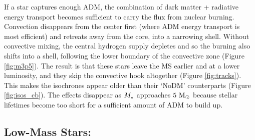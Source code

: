 \documentclass[useAMS,usenatbib]{mnras}
\begin{document}
  If a star captures enough ADM, the combination of dark matter + radiative energy transport becomes sufficient to carry the flux from nuclear burning. Convection disappears from the center first (where ADM energy transport is most efficient) and retreats away from the core, into a narrowing shell. Without convective mixing, the central hydrogen supply depletes and so the burning also shifts into a shell, following the lower boundary of the convective zone (Figure \ref{fig:m3p5}). The result is that these stars leave the MS earlier and at a lower luminosity, and they skip the convective hook altogether (Figure \ref{fig:tracks}). This makes the isochrones appear older than their `NoDM' counterparts (Figure \ref{fig:isos_cb}). The effects disappear as $M_{\star}$ approaches $5 \ \mathrm{M}_{\odot}$ because stellar lifetimes become too short for a sufficient amount of ADM to build up.


\subsection{Low-Mass Stars: \mrangelow}
\label{sub:lowmass}
\end{document}
